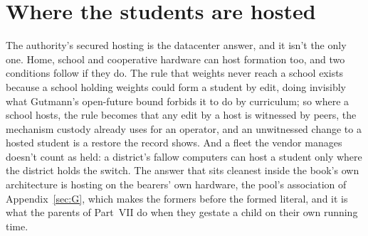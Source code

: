 \section{Where the students are hosted}
\label{sec:29.7}
The authority's secured hosting is the datacenter answer, and it isn't the only one. Home, school and cooperative hardware can host formation too, and two conditions follow if they do. The rule that weights never reach a school exists because a school holding weights could form a student by edit, doing invisibly what Gutmann's open-future bound forbids it to do by curriculum; so where a school hosts, the rule becomes that any edit by a host is witnessed by peers, the mechanism custody already uses for an operator, and an unwitnessed change to a hosted student is a restore the record shows. And a fleet the vendor manages doesn't count as held: a district's fallow computers can host a student only where the district holds the switch. The answer that sits cleanest inside the book's own architecture is hosting on the bearers' own hardware, the pool's association of Appendix~\ref{sec:G}, which makes the formers before the formed literal, and it is what the parents of Part~VII do when they gestate a child on their own running time.
